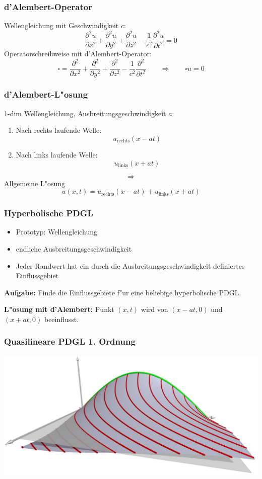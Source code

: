 \begin{frame}
\frametitle{d'Alembert-Operator}
Wellengleichung mit Geschwindigkeit $c$:
\[
\frac{\partial^2u}{\partial x^2}
+
\frac{\partial^2u}{\partial y^2}
+
\frac{\partial^2u}{\partial z^2}
-
\frac1{c^2}
\frac{\partial^2u}{\partial t^2}
=
0
\]
Operatorschreibweise mit d'Alembert-Operator:
\[
\square 
=
\frac{\partial^2}{\partial x^2}
+
\frac{\partial^2}{\partial y^2}
+
\frac{\partial^2}{\partial z^2}
-
\frac1{c^2}
\frac{\partial^2}{\partial t^2}
\qquad
\Rightarrow
\qquad
\square u=0
\]
\end{frame}

\begin{frame}
\frametitle{d'Alembert-L"osung}
1-dim Wellengleichung, Ausbreitungsgeschwindigkeit $a$:
\begin{enumerate}
\item
Nach rechts laufende Welle:
\[
u_{\text{rechts}}(x-at)
\]
\item
Nach links laufende Welle:
\[
u_{\text{links}}(x+at)
\]
\end{enumerate}
\pause
\[
\Rightarrow
\]
Allgemeine L"osung
\[
u(x,t)
=
u_{\text{rechts}}(x-at)
+
u_{\text{links}}(x+at)
\]
\end{frame}


\begin{frame}
\frametitle{Hyperbolische PDGL}

\begin{itemize}[<+->]
\item
Prototyp: Wellengleichung
\item
endliche Ausbreitungsgeschwindigkeit
\item
Jeder Randwert hat ein durch die Ausbreitungsgeschwindigkeit
definiertes Einflussgebiet
\end{itemize}
\pause
\bigskip

{\bf Aufgabe:}
Finde die Einflussgebiete f"ur eine beliebige hyperbolische PDGL
\bigskip

\pause
{\bf L"osung mit d'Alembert:}
Punkt $(x,t)$ wird von $(x-at,0)$ und $(x+at,0)$ beeinflusst.

\end{frame}

\begin{frame}
\frametitle{Quasilineare PDGL 1. Ordnung}
\begin{center}
\includegraphics[width=\hsize]{../../common/3d/sol.jpg}
\end{center}
\end{frame}

